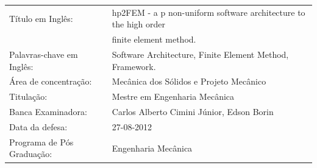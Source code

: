 \vspace{0.2in}
\begin{tabular}{ll}
Título em Inglês: &
hp2FEM - a p non-uniform software architecture to the high order	\\
& finite element method.						\\
Palavras-chave em Inglês: &
Software Architecture, Finite Element Method, Framework.		\\
Área de concentração: & Mecânica dos Sólidos e Projeto Mecânico	\\
Titulação: &
Mestre em Engenharia Mecânica						\\
Banca Examinadora: & Carlos Alberto Cimini Júnior, Edson Borin		\\
Data da defesa: & 27-08-2012						\\
Programa de Pós Graduação:& Engenharia Mecânica
\end{tabular}
\fancyhead{}	%


\clearpage
\setcounter{page}{5}

